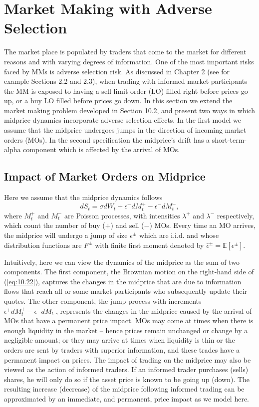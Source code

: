 \documentclass[11pt, a4paper]{book}
\newcommand{\E}{\mathbb{E}}
\begin{document}
	\section{Market Making with Adverse Selection}
	
	The market place is populated by traders that come to the market for different reasons and with varying degrees of information. One of the most important risks faced by MMs is adverse selection risk. As discussed in Chapter 2 (see for example Sections 2.2 and 2.3), when trading with informed market participants the MM is exposed to having a sell limit order (LO) filled right before prices go up, or a buy LO filled before prices go down. In this section we extend the market making problem developed in Section 10.2, and present two ways in which midprice dynamics incorporate adverse selection effects. In the first model we assume that the midprice undergoes jumps in the direction of incoming market orders (MOs). In the second specification the midprice's drift has a short-term-alpha component which is affected by the arrival of MOs.
	
	\subsection{Impact of Market Orders on Midprice} \label{sec:10.4.1}
	
	Here we assume that the midprice dynamics follows
	\begin{equation}
		dS_t = \sigma dW_t + \epsilon^+ dM^+_t - \epsilon^- dM^-_t, \label{eq:10.22}
	\end{equation}
	where $M^+_t$ and $M^-_t$ are Poisson processes, with intensities $\lambda^+$ and $\lambda^-$ respectively, which count the number of buy ($+$) and sell ($-$) MOs. Every time an MO arrives, the midprice will undergo a jump of size $\epsilon^\pm$ which are i.i.d. and whose distribution functions are $F^\pm$ with finite first moment denoted by $\bar{\epsilon}^\pm = \E[\epsilon^\pm]$.
	
	Intuitively, here we can view the dynamics of the midprice as the sum of two components. The first component, the Brownian motion on the right-hand side of (\ref{eq:10.22}), captures the changes in the midprice that are due to information flows that reach all or some market participants who subsequently update their quotes. The other component, the jump process with increments $\epsilon^+ dM^+_t - \epsilon^- dM^-_t$, represents the changes in the midprice caused by the arrival of MOs that have a permanent price impact. MOs may come at times when there is enough liquidity in the market – hence prices remain unchanged or change by a negligible amount; or they may arrive at times when liquidity is thin or the orders are sent by traders with superior information, and these trades have a permanent impact on prices. The impact of trading on the midprice may also be viewed as the action of informed traders. If an informed trader purchases (sells) shares, he will only do so if the asset price is known to be going up (down). The resulting increase (decrease) of the midprice following informed trading can be approximated by an immediate, and permanent, price impact as we model here.
	
\end{document}
